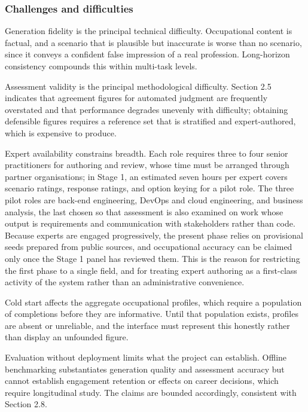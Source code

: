 \subsubsection{Challenges and difficulties}

Generation fidelity is the principal technical difficulty. Occupational content is factual, and a scenario that is plausible but inaccurate is worse than no scenario, since it conveys a confident false impression of a real profession. Long-horizon consistency compounds this within multi-task levels.

Assessment validity is the principal methodological difficulty. Section 2.5 indicates that agreement figures for automated judgment are frequently overstated and that performance degrades unevenly with difficulty; obtaining defensible figures requires a reference set that is stratified and expert-authored, which is expensive to produce.

Expert availability constrains breadth. Each role requires three to four senior practitioners for authoring and review, whose time must be arranged through partner organisations; in Stage 1, an estimated seven hours per expert covers scenario ratings, response ratings, and option keying for a pilot role. The three pilot roles are back-end engineering, DevOps and cloud engineering, and business analysis, the last chosen so that assessment is also examined on work whose output is requirements and communication with stakeholders rather than code. Because experts are engaged progressively, the present phase relies on provisional seeds prepared from public sources, and occupational accuracy can be claimed only once the Stage 1 panel has reviewed them. This is the reason for restricting the first phase to a single field, and for treating expert authoring as a first-class activity of the system rather than an administrative convenience.

Cold start affects the aggregate occupational profiles, which require a population of completions before they are informative. Until that population exists, profiles are absent or unreliable, and the interface must represent this honestly rather than display an unfounded figure.

Evaluation without deployment limits what the project can establish. Offline benchmarking substantiates generation quality and assessment accuracy but cannot establish engagement retention or effects on career decisions, which require longitudinal study. The claims are bounded accordingly, consistent with Section 2.8.

